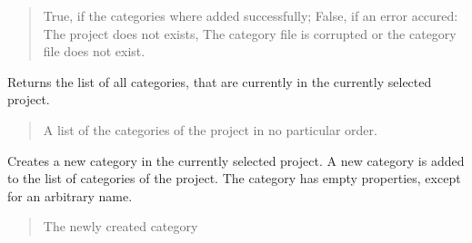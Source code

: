 \documentclass[letterpaper,10pt,english]{sphinxmanual}
\begin{document}
\begin{fulllineitems}
\begin{fulllineitems}
\begin{quote}
\begin{description}
\sphinxAtStartPar
True, if the categories where added successfully; False, if an error accured: The project does not exists, The category file is corrupted or the category file does not exist.

\sphinxAtStartPar
{}

\end{description}\end{quote}

\end{fulllineitems}


\begin{fulllineitems}
\label{\detokenize{apidoc/src.osm_configurator.control:src.osm_configurator.control.control.Control.get_list_of_categories}}
\pysigstartsignatures
{}
\pysigstopsignatures
\sphinxAtStartPar
Returns the list of all categories, that are currently in the currently selected project.
\begin{quote}\begin{description}
\sphinxAtStartPar
A list of the categories of the project in no particular order.

\sphinxAtStartPar
{}

\end{description}\end{quote}

\end{fulllineitems}


\begin{fulllineitems}
\label{\detokenize{apidoc/src.osm_configurator.control:src.osm_configurator.control.control.Control.create_category}}
\pysigstartsignatures
{}
\pysigstopsignatures
\sphinxAtStartPar
Creates a new category in the currently selected project.
A new category is added to the list of categories of the project. The category has empty properties, except for an arbitrary name.
\begin{quote}\begin{description}
\sphinxAtStartPar
The newly created category


\end{description}
\end{quote}
\end{fulllineitems}
\end{fulllineitems}
\end{document}

